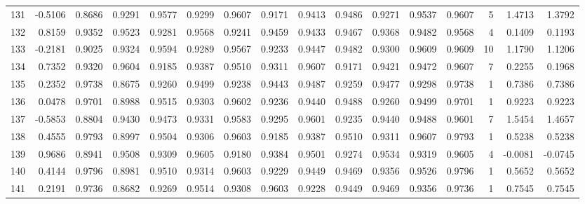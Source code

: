 \begin{tabular}{lrrrrrrrrrrrrrrr}
131 &     -0.5106 &  0.8686 &  0.9291 &  0.9577 &  0.9299 &  0.9607 &  0.9171 &  0.9413 &  0.9486 &  0.9271 &   0.9537 &     0.9607 &      5 &                    1.4713 &                     1.3792 \\
132 &      0.8159 &  0.9352 &  0.9523 &  0.9281 &  0.9568 &  0.9241 &  0.9459 &  0.9433 &  0.9467 &  0.9368 &   0.9482 &     0.9568 &      4 &                    0.1409 &                     0.1193 \\
133 &     -0.2181 &  0.9025 &  0.9324 &  0.9594 &  0.9289 &  0.9567 &  0.9233 &  0.9447 &  0.9482 &  0.9300 &   0.9609 &     0.9609 &     10 &                    1.1790 &                     1.1206 \\
134 &      0.7352 &  0.9320 &  0.9604 &  0.9185 &  0.9387 &  0.9510 &  0.9311 &  0.9607 &  0.9171 &  0.9421 &   0.9472 &     0.9607 &      7 &                    0.2255 &                     0.1968 \\
135 &      0.2352 &  0.9738 &  0.8675 &  0.9260 &  0.9499 &  0.9238 &  0.9443 &  0.9487 &  0.9259 &  0.9477 &   0.9298 &     0.9738 &      1 &                    0.7386 &                     0.7386 \\
136 &      0.0478 &  0.9701 &  0.8988 &  0.9515 &  0.9303 &  0.9602 &  0.9236 &  0.9440 &  0.9488 &  0.9260 &   0.9499 &     0.9701 &      1 &                    0.9223 &                     0.9223 \\
137 &     -0.5853 &  0.8804 &  0.9430 &  0.9473 &  0.9331 &  0.9583 &  0.9295 &  0.9601 &  0.9235 &  0.9440 &   0.9488 &     0.9601 &      7 &                    1.5454 &                     1.4657 \\
138 &      0.4555 &  0.9793 &  0.8997 &  0.9504 &  0.9306 &  0.9603 &  0.9185 &  0.9387 &  0.9510 &  0.9311 &   0.9607 &     0.9793 &      1 &                    0.5238 &                     0.5238 \\
139 &      0.9686 &  0.8941 &  0.9508 &  0.9309 &  0.9605 &  0.9180 &  0.9384 &  0.9501 &  0.9274 &  0.9534 &   0.9319 &     0.9605 &      4 &                   -0.0081 &                    -0.0745 \\
140 &      0.4144 &  0.9796 &  0.8981 &  0.9510 &  0.9314 &  0.9603 &  0.9229 &  0.9449 &  0.9469 &  0.9356 &   0.9526 &     0.9796 &      1 &                    0.5652 &                     0.5652 \\
141 &      0.2191 &  0.9736 &  0.8682 &  0.9269 &  0.9514 &  0.9308 &  0.9603 &  0.9228 &  0.9449 &  0.9469 &   0.9356 &     0.9736 &      1 &                    0.7545 &                     0.7545 \\

\end{tabular}
